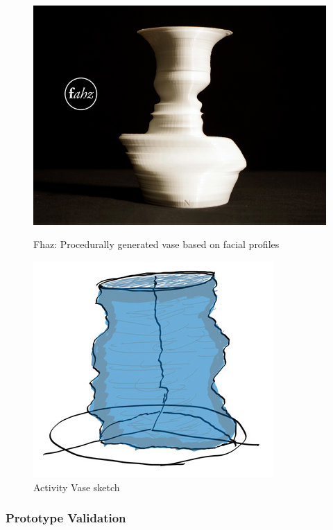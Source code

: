 \documentclass[../medieninformatik-arbeit.tex]{subfiles}
\begin{document}
\begin{figure}[h]
\centering
\begin{minipage}{.45\textwidth}
\centering
	\includegraphics[width=\linewidth]{Prototype/img/fhaz}
	\caption{Fhaz: Procedurally generated vase based on facial profiles\cite{fahz}}
	\label{fig:fhaz}
\end{minipage}
\begin{minipage}{.45\textwidth}
\centering
  \includegraphics[width=0.75\linewidth]{Prototype/img/ActivityVase_detail}
  \caption{Activity Vase sketch}
  \label{fig:activityvase}
\end{minipage}
\end{figure}

\subsubsection{Prototype Validation}
\end{document}
